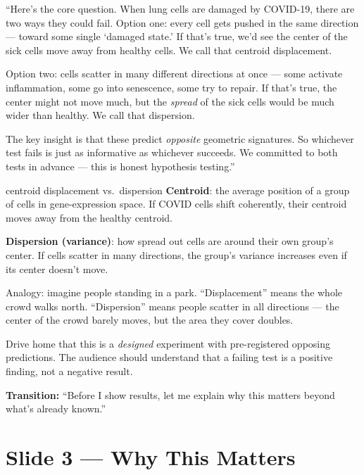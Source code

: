 \documentclass[11pt]{article}
\begin{document}
\begin{speaknote}
``Here's the core question. When lung cells are damaged by COVID-19, there are two ways they could fail. Option one: every cell gets pushed in the same direction --- toward some single `damaged state.' If that's true, we'd see the center of the sick cells move away from healthy cells. We call that centroid displacement.

Option two: cells scatter in many different directions at once --- some activate inflammation, some go into senescence, some try to repair. If that's true, the center might not move much, but the \emph{spread} of the sick cells would be much wider than healthy. We call that dispersion.

The key insight is that these predict \emph{opposite} geometric signatures. So whichever test fails is just as informative as whichever succeeds. We committed to both tests in advance --- this is honest hypothesis testing.''
\end{speaknote}

\begin{jargon}{centroid displacement vs.\ dispersion}
\textbf{Centroid}: the average position of a group of cells in gene-expression space. If COVID cells shift coherently, their centroid moves away from the healthy centroid.

\textbf{Dispersion (variance)}: how spread out cells are around their own group's center. If cells scatter in many directions, the group's variance increases even if its center doesn't move.

Analogy: imagine people standing in a park. ``Displacement'' means the whole crowd walks north. ``Dispersion'' means people scatter in all directions --- the center of the crowd barely moves, but the area they cover doubles.
\end{jargon}

\begin{resultbox}
Drive home that this is a \emph{designed} experiment with pre-registered opposing predictions. The audience should understand that a failing test is a positive finding, not a negative result.
\end{resultbox}

\textbf{Transition:} ``Before I show results, let me explain why this matters beyond what's already known.''


\section{Slide 3 --- Why This Matters}
\end{document}
